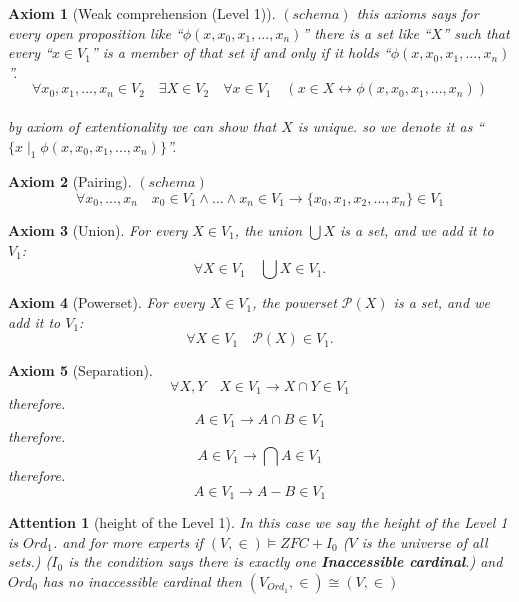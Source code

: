 \documentclass[10pt,a4paper]{book}
\newtheorem{axiom}{Axiom}[section]
\newtheorem{Attention}{Attention}[section]
\begin{document}


\begin{axiom}[Weak comprehension (Level 1)] $(schema)$ this axioms says for every open proposition
    like ``$\phi (x,x_0 , x_1, ... , x_n)$'' there is a set like ``$X$'' such that every ``$x \in V_1$'' is a
    member of that set if and only if it holds
    ``$\phi (x,x_0 , x_1, ... , x_n)$''.
    \\
    \[ \forall x_0 , x_1, ... , x_n  \in V_2 \quad \exists X  \in V_2 \quad \forall x  \in V_1 \quad ( x \in X \leftrightarrow \phi (x,x_0 , x_1, ... , x_n) ) \]
    \\
    by axiom of extentionality we can show that $X$ is unique.
    so we denote it as ``$\{ x \mid_1  \phi (x,x_0 , x_1, ... , x_n)\}$''.
\end{axiom}


\begin{axiom}[Pairing]  $(schema)$
    \[ \forall x_0,...,x_n \quad x_0 \in V_1 \land ... \land x_n \in V_1 \to \{x_{0}, x_{1}, x_{2}, ... ,x_{n} \} \in V_1 \]
\end{axiom}

\begin{axiom}[Union]
    For every \(X \in V_1\), the union \(\bigcup X\) is a set, and we add
    it to \(V_1\):
    \[
        \forall X \in V_1 \quad \bigcup X   \in V_1 .
    \]
\end{axiom}

\begin{axiom}[Powerset]
    For every \(X \in V_1\), the powerset \(\mathcal{P}(X)\) is a set,
    and we add it to \(V_1\):
    \[
        \forall X \in V_1 \quad  \mathcal{P}(X) \in V_1 .
    \]
\end{axiom}


\begin{axiom}[Separation]
    \[ \forall X,Y \quad  X \in V_1 \to X \cap Y  \in V_1 \]
    therefore.
    \[ A \in V_1  \to  A \cap B \in V_1  \]
    therefore.
    \[  A \in V_1  \to  \bigcap A \in V_1  \]
    therefore.
    \[ A \in V_1  \to  A - B \in V_1  \]
\end{axiom}

\begin{Attention}[height of the Level 1]
    In this case we say the height of the Level 1  is $Ord_1$.
    and for more experts if $(V , \in ) \models  ZFC + I_0$
    ($V$ is the universe of all sets.)
    ($I_0$ is the condition says there is exactly one \textbf{Inaccessible  cardinal}.)
    and $Ord_0$ has no inaccessible cardinal then $ ( V_{Ord_1} , \in ) \cong ( V , \in )  $
\end{Attention}
\end{document}

